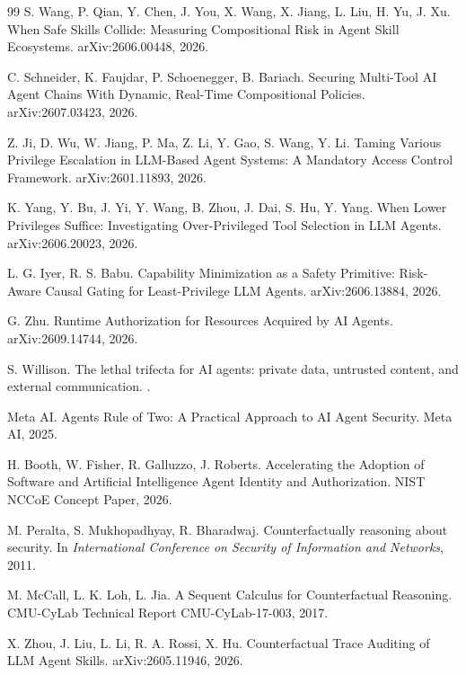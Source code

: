 \documentclass[11pt]{article}
\begin{document}
\begin{thebibliography}{99}
S. Wang, P. Qian, Y. Chen, J. You, X. Wang, X. Jiang, L. Liu, H. Yu, J. Xu.
\newblock When Safe Skills Collide: Measuring Compositional Risk in Agent Skill Ecosystems.
\newblock arXiv:2606.00448, 2026.

C. Schneider, K. Faujdar, P. Schoenegger, B. Bariach.
\newblock Securing Multi-Tool AI Agent Chains With Dynamic, Real-Time Compositional Policies.
\newblock arXiv:2607.03423, 2026.

Z. Ji, D. Wu, W. Jiang, P. Ma, Z. Li, Y. Gao, S. Wang, Y. Li.
\newblock Taming Various Privilege Escalation in LLM-Based Agent Systems: A Mandatory Access Control Framework.
\newblock arXiv:2601.11893, 2026.

K. Yang, Y. Bu, J. Yi, Y. Wang, B. Zhou, J. Dai, S. Hu, Y. Yang.
\newblock When Lower Privileges Suffice: Investigating Over-Privileged Tool Selection in LLM Agents.
\newblock arXiv:2606.20023, 2026.

L. G. Iyer, R. S. Babu.
\newblock Capability Minimization as a Safety Primitive: Risk-Aware Causal Gating for Least-Privilege LLM Agents.
\newblock arXiv:2606.13884, 2026.

G. Zhu.
\newblock Runtime Authorization for Resources Acquired by AI Agents.
\newblock arXiv:2609.14744, 2026.

S. Willison.
\newblock The lethal trifecta for AI agents: private data, untrusted content, and external communication.
.

Meta AI.
\newblock Agents Rule of Two: A Practical Approach to AI Agent Security.
\newblock Meta AI, 2025.

H. Booth, W. Fisher, R. Galluzzo, J. Roberts.
\newblock Accelerating the Adoption of Software and Artificial Intelligence Agent Identity and Authorization.
\newblock NIST NCCoE Concept Paper, 2026.

M. Peralta, S. Mukhopadhyay, R. Bharadwaj.
\newblock Counterfactually reasoning about security.
\newblock In \emph{International Conference on Security of Information and Networks}, 2011.

M. McCall, L. K. Loh, L. Jia.
\newblock A Sequent Calculus for Counterfactual Reasoning.
\newblock CMU-CyLab Technical Report CMU-CyLab-17-003, 2017.

X. Zhou, J. Liu, L. Li, R. A. Rossi, X. Hu.
\newblock Counterfactual Trace Auditing of LLM Agent Skills.
\newblock arXiv:2605.11946, 2026.


\end{thebibliography}
\end{document}
